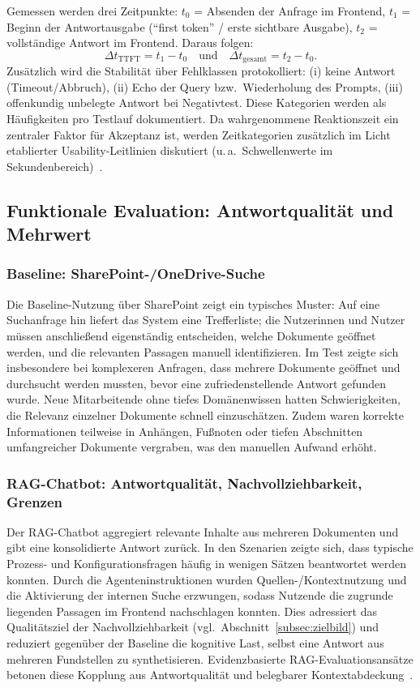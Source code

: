 Gemessen werden drei Zeitpunkte:
$t_0$ = Absenden der Anfrage im Frontend,
$t_1$ = Beginn der Antwortausgabe (\enquote{first token} / erste sichtbare Ausgabe),
$t_2$ = vollständige Antwort im Frontend.
Daraus folgen:
\[
    \Delta t_{\text{TTFT}} = t_1 - t_0 \quad \text{und} \quad \Delta t_{\text{gesamt}} = t_2 - t_0.
\]
Zusätzlich wird die Stabilität über Fehlklassen protokolliert:
(i) keine Antwort (Timeout/Abbruch),
(ii) Echo der Query bzw.\ Wiederholung des Prompts,
(iii) offenkundig unbelegte Antwort bei Negativtest.
Diese Kategorien werden als Häufigkeiten pro Testlauf dokumentiert.
Da wahrgenommene Reaktionszeit ein zentraler Faktor für Akzeptanz ist, werden Zeitkategorien zusätzlich im Licht etablierter Usability-Leitlinien diskutiert (u.\,a.\ Schwellenwerte im Sekundenbereich)~\cite{nielsen_response_times}.

\subsection{Funktionale Evaluation: Antwortqualität und Mehrwert}\label{subsec:funktionale-evaluation}

\subsubsection{Baseline: SharePoint-/OneDrive-Suche}

Die Baseline-Nutzung über SharePoint zeigt ein typisches Muster:
Auf eine Suchanfrage hin liefert das System eine Trefferliste; die Nutzerinnen und Nutzer müssen anschließend eigenständig entscheiden, welche Dokumente geöffnet werden, und die relevanten Passagen manuell identifizieren.
Im Test zeigte sich insbesondere bei komplexeren Anfragen, dass mehrere Dokumente geöffnet und durchsucht werden mussten, bevor eine zufriedenstellende Antwort gefunden wurde.
Neue Mitarbeitende ohne tiefes Domänenwissen hatten Schwierigkeiten, die Relevanz einzelner Dokumente schnell einzuschätzen.
Zudem waren korrekte Informationen teilweise in Anhängen, Fußnoten oder tiefen Abschnitten umfangreicher Dokumente vergraben, was den manuellen Aufwand erhöht.

\subsubsection{RAG-Chatbot: Antwortqualität, Nachvollziehbarkeit, Grenzen}

Der RAG-Chatbot aggregiert relevante Inhalte aus mehreren Dokumenten und gibt eine konsolidierte Antwort zurück.
In den Szenarien zeigte sich, dass typische Prozess- und Konfigurationsfragen häufig in wenigen Sätzen beantwortet werden konnten.
Durch die Agenteninstruktionen wurden Quellen-/Kontextnutzung und die Aktivierung der internen Suche erzwungen, sodass Nutzende die zugrunde liegenden Passagen im Frontend nachschlagen konnten.
Dies adressiert das Qualitätsziel der Nachvollziehbarkeit (vgl.\ Abschnitt~\ref{subsec:zielbild}) und reduziert gegenüber der Baseline die kognitive Last, selbst eine Antwort aus mehreren Fundstellen zu synthetisieren.
Evidenzbasierte RAG-Evaluationsansätze betonen diese Kopplung aus Antwortqualität und belegbarer Kontextabdeckung~\cite{ragas}.


